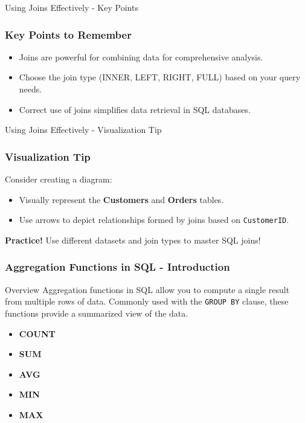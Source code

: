 \documentclass[aspectratio=169]{beamer}
\begin{document}
\begin{frame}[fragile]{Using Joins Effectively - Key Points}
    \frametitle{Key Points to Remember}
    \begin{itemize}
        \item Joins are powerful for combining data for comprehensive analysis.
        \item Choose the join type (INNER, LEFT, RIGHT, FULL) based on your query needs.
        \item Correct use of joins simplifies data retrieval in SQL databases.
    \end{itemize}
\end{frame}

\begin{frame}[fragile]{Using Joins Effectively - Visualization Tip}
    \frametitle{Visualization Tip}
    Consider creating a diagram:
    \begin{itemize}
        \item Visually represent the \textbf{Customers} and \textbf{Orders} tables.
        \item Use arrows to depict relationships formed by joins based on \texttt{CustomerID}.
    \end{itemize}

    \textbf{Practice!} Use different datasets and join types to master SQL joins!
\end{frame}

\begin{frame}[fragile]
    \frametitle{Aggregation Functions in SQL - Introduction}
    \begin{block}{Overview}
        Aggregation functions in SQL allow you to compute a single result from multiple rows of data. 
        Commonly used with the \texttt{GROUP BY} clause, these functions provide a summarized view of the data.
    \end{block}
    \begin{itemize}
        \item \textbf{COUNT}
        \item \textbf{SUM}
        \item \textbf{AVG}
        \item \textbf{MIN}
        \item \textbf{MAX}
    \end{itemize}
\end{frame}
\end{document}
